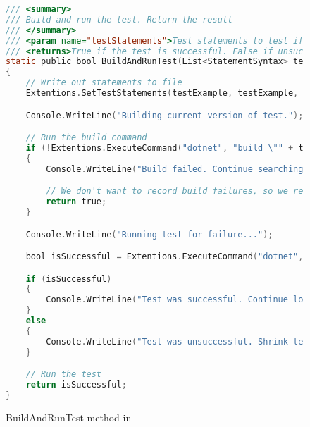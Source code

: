 \clearpage %

\label{BuildAndRun Method}

\begin{figure}
\begin{lstlisting}[language=C]
/// <summary>
/// Build and run the test. Return the result
/// </summary>
/// <param name="testStatements">Test statements to test if successful</param>
/// <returns>True if the test is successful. False if unsuccessful</returns>
static public bool BuildAndRunTest(List<StatementSyntax> testStatements)
{
	// Write out statements to file
	Extentions.SetTestStatements(testExample, testExample, testName, testStatements);

	Console.WriteLine("Building current version of test.");

	// Run the build command
	if (!Extentions.ExecuteCommand("dotnet", "build \"" + testProj + "\""))
	{
		Console.WriteLine("Build failed. Continue searching for failing test.");

		// We don't want to record build failures, so we return true to not remember them in the algorithm
		return true;
	}

	Console.WriteLine("Running test for failure...");

	bool isSuccessful = Extentions.ExecuteCommand("dotnet", "test \"" + testProj + "\" --filter \"FullyQualifiedName=" + Extentions.GetTestCallString(testExample, testName) + "\"");

	if (isSuccessful)
	{
		Console.WriteLine("Test was successful. Continue looking for failing test.");
	}
	else
	{
		Console.WriteLine("Test was unsuccessful. Shrink test statements.");
	}

	// Run the test
	return isSuccessful;
}
\end{lstlisting}
\caption{BuildAndRunTest method in \mytool}
\label{fig:buildAndRunTest1}
\end{figure}
